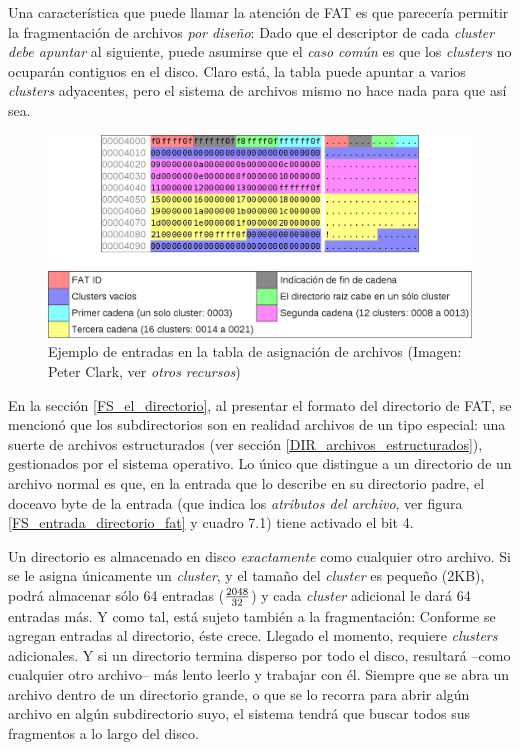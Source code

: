 \documentclass[11pt,fleqn]{book} %
\begin{document}
Una característica que puede llamar la atención de FAT es que
parecería permitir la fragmentación de archivos \emph{por diseño}: Dado que
el descriptor de cada \emph{cluster} \emph{debe apuntar} al siguiente, puede
asumirse que el \emph{caso común} es que los \emph{clusters} no ocuparán contiguos
en el disco. Claro está, la tabla puede apuntar a varios \emph{clusters}
adyacentes, pero el sistema de archivos mismo no hace nada para que
así sea.

\begin{figure}[htb]
\centering
\includegraphics[width=\textwidth]{../img/tabla_fat.png}
\caption{\label{FS_tabla_fat}Ejemplo de entradas en la tabla de asignación de archivos (Imagen: Peter Clark, ver \emph{otros recursos})}
\end{figure}

En la sección \ref{FS_el_directorio}, al presentar el formato del
directorio de FAT, se mencionó que los subdirectorios son en realidad
archivos de un tipo especial: una suerte de archivos estructurados
(ver sección \ref{DIR_archivos_estructurados}), gestionados por el
sistema operativo. Lo único que distingue a un directorio de un
archivo normal es que, en la entrada que lo describe en su directorio
padre, el doceavo byte de la entrada (que indica los \emph{atributos del archivo}, ver figura \ref{FS_entrada_directorio_fat} y cuadro
7.1) tiene activado el bit 4.

Un directorio es almacenado en disco \emph{exactamente} como cualquier otro
archivo. Si se le asigna únicamente un \emph{cluster}, y el tamaño del
\emph{cluster} es pequeño (2KB), podrá almacenar sólo 64 entradas ($2048
\over 32$) y cada
\emph{cluster} adicional le dará 64 entradas más. Y como tal, está sujeto
también a la fragmentación: Conforme se agregan entradas al
directorio, éste crece. Llegado el momento, requiere \emph{clusters}
adicionales. Y si un directorio termina disperso por todo el disco,
resultará –como cualquier otro archivo– más lento leerlo y trabajar
con él. Siempre que se abra un archivo dentro de un directorio grande,
o que se lo recorra para abrir algún archivo en algún subdirectorio
suyo, el sistema tendrá que buscar todos sus fragmentos a lo largo del
disco.
\end{document}
